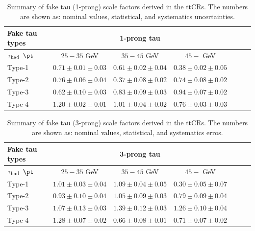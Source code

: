 \begin{table}
\caption{ Summary of fake tau (1-prong) scale factors derived in the ttCRs. The numbers are shown as: nominal values, statistical, and systematics uncertainties. }
\begin{center}
\begin{tabular}{lcccccc}
\toprule\toprule

Fake tau types & \multicolumn{3}{c}{1-prong tau}  \\ \midrule
$\tau_\text{had}$ $\pt$                                   &  $25-35$ GeV  & $35-45$ GeV  &  $45-$ GeV            \\
\midrule
Type-1                          &$0.71 \pm 0.01 \pm 0.03 $ &$0.61 \pm 0.02 \pm 0.04 $ &$0.38 \pm 0.02 \pm 0.05 $  \\
Type-2                          &$0.76 \pm 0.06 \pm 0.04 $ & $0.37 \pm 0.08 \pm 0.02$ & $0.74 \pm 0.08 \pm 0.02 $ \\
Type-3                          &$0.62 \pm 0.10 \pm 0.03 $ &$0.83 \pm 0.09 \pm 0.03 $ &$0.94 \pm 0.07 \pm 0.02 $  \\
Type-4                          &$1.20 \pm 0.02 \pm 0.01 $ & $1.01 \pm 0.04 \pm 0.02 $ &$0.76 \pm 0.03 \pm 0.03 $  \\
\bottomrule\bottomrule
\end{tabular}
\label{tab:ff1_summary}
\end{center}
\end{table}


\begin{table}
\caption{ Summary of fake tau (3-prong) scale factors derived in the ttCRs. The numbers are shown as: nominal values, statistical, and systematics erros. }
\begin{center}
\begin{tabular}{lcccccc}
\toprule\toprule

Fake tau types        & \multicolumn{3}{c}{3-prong tau}  \\ \midrule
$\tau_\text{had}$ $\pt$                             &  $25-35$ GeV  & $35-45$ GeV       &  $45-$ GeV  \\
\midrule
Type-1                                    & $1.01 \pm 0.03 \pm 0.04 $ & $1.09 \pm 0.04 \pm 0.05 $ & $0.30 \pm 0.05 \pm 0.07 $ \\
Type-2                                    & $0.93 \pm 0.10 \pm 0.04 $ & $1.05 \pm 0.09 \pm 0.03 $ & $0.79 \pm 0.09 \pm 0.04 $ \\
Type-3                                    & $1.07 \pm 0.13 \pm 0.03 $ &$1.39 \pm 0.12 \pm 0.03 $ &$1.26 \pm 0.10 \pm 0.04 $  \\
Type-4                                    &$1.28 \pm 0.07 \pm 0.02 $ &$0.66 \pm 0.08 \pm 0.01 $ & $0.71 \pm 0.07 \pm 0.02 $ \\
\bottomrule\bottomrule
\end{tabular}
\label{tab:ff2_summary}
\end{center}
\end{table}


